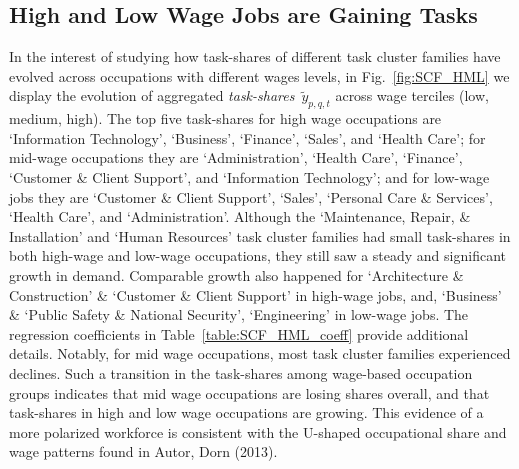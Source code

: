 \documentclass[letterpaper]{article} %
\begin{document}
\subsection{High and Low Wage Jobs are Gaining Tasks}
\label{subsec:mid_wage}
%
In the interest of studying how task-shares of different task cluster families have evolved across occupations with different wages levels, in Fig.~\ref{fig:SCF_HML} we display the evolution of aggregated \emph{task-shares}~$\tilde{y}_{p,q,t}$ across wage terciles (low, medium, high). The top five task-shares for high wage occupations are `Information Technology', `Business', `Finance', `Sales', and `Health Care'; for mid-wage occupations they are `Administration', `Health Care', `Finance', `Customer \& Client Support', and `Information Technology'; and for low-wage jobs they are `Customer \& Client Support', `Sales', `Personal Care \& Services', `Health Care', and `Administration'. Although the `Maintenance, Repair, \& Installation' and `Human Resources' task cluster families had small task-shares in both high-wage and low-wage occupations, they still saw a steady and significant growth in demand. Comparable growth also happened for `Architecture \& Construction' \& `Customer \& Client Support' in high-wage jobs, and, `Business' \& `Public Safety \& National Security', `Engineering' in low-wage jobs. The regression coefficients in Table~\ref{table:SCF_HML_coeff} provide additional details. Notably, for mid wage occupations, most task cluster families experienced declines. Such a transition in the task-shares among wage-based occupation groups indicates that mid wage occupations are losing shares overall, and that task-shares in high and low wage occupations are growing. This evidence of a more polarized workforce is consistent with the U-shaped occupational share and wage patterns found in Autor, Dorn (2013).
\end{document}
